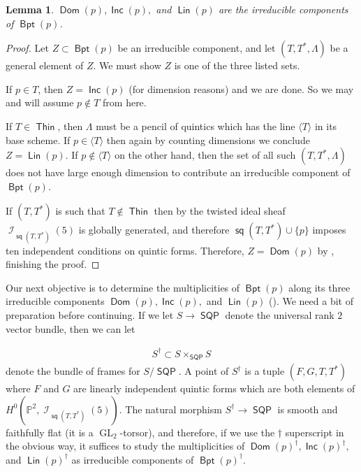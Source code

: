 \documentclass[reqno, 11pt]{amsart}
\theoremstyle{plain}
\newtheorem{lemma}[theorem]{Lemma}
\theoremstyle{remark}
\renewcommand{\P}{\mathbb{P}}
\DeclareMathOperator{\I}{\mathcal{I}}
\DeclareMathOperator{\Thin}{\mathsf{Thin}}
\DeclareMathOperator{\SQP}{\mathsf{SQP}}
\DeclareMathOperator{\s}{\mathsf{sq}}
\DeclareMathOperator{\BP}{\mathsf{Bpt}}
\DeclareMathOperator{\Dom}{\mathsf{Dom}}
\DeclareMathOperator{\Lin}{\mathsf{Lin}}
\DeclareMathOperator{\Inc}{\mathsf{Inc}}
\DeclareMathOperator{\GL}{GL}
\begin{document}
\begin{lemma}
    \label{lemma:threecomponents} $\Dom(p), \Inc(p),$ and $\Lin(p)$ are the irreducible components of $\BP(p)$.
\end{lemma}

\begin{proof}
    Let $Z \subset \BP(p)$ be an irreducible component, and let $(T,T^{*},\Lambda)$ be a general element of $Z$.  We must show $Z$ is one of the three listed sets.
    
    If $p \in T$, then $Z = \Inc(p)$ (for dimension reasons) and we are done.  So we may and will assume $p \notin T$ from here.  

    If $T \in \Thin$, then $\Lambda$ must be a pencil of quintics which has the line $\langle T\rangle$ in its base scheme. If $p \in \langle T \rangle$ then again by counting dimensions we conclude $Z = \Lin(p)$.  If $p \notin \langle T \rangle$ on the other hand, then the set of all such $(T,T^{*},\Lambda)$ does not have large enough dimension to contribute an irreducible component of $\BP(p)$.

    If $(T,T^{*})$ is such that $T \notin \Thin$ then by  the twisted ideal sheaf $\I_{\s(T,T^{*})}(5)$ is globally generated, and therefore $\s(T,T^{*}) \cup \{p\}$ imposes ten independent conditions on quintic forms.  Therefore, $Z = \Dom(p)$ by , finishing the proof.    
\end{proof} 

Our next objective is to determine the multiplicities of $\BP(p)$ along its three irreducible components $\Dom(p), \Inc(p),$ and $\Lin(p)$ ().   We need a bit of preparation before continuing.  If we let $S \to \SQP$ denote the universal rank $2$ vector bundle, then we can let  

\begin{eqnarray}
    S^{\dagger} \subset S \times _{\SQP}S
\end{eqnarray}
denote the bundle of frames for $S/\SQP$.  A point of $S^{\dagger}$ is a tuple $(F,G,T,T^{*})$ where $F$ and $G$ are linearly independent quintic forms which are both elements of $H^{0}\left(\P^{2}, \I_{\s(T,T^{*})}(5)\right)$.  The natural morphism $S^{\dagger} \to \SQP$ is smooth and faithfully flat (it is a $\GL_{2}$-torsor), and therefore, if we use the $\dagger$ superscript in the obvious way, it suffices to study the multiplicities of $\Dom(p)^{\dagger}, \Inc(p)^{\dagger},$ and $\Lin(p)^{\dagger}$ as irreducible components of $\BP(p)^{\dagger}$.  
\end{document}
